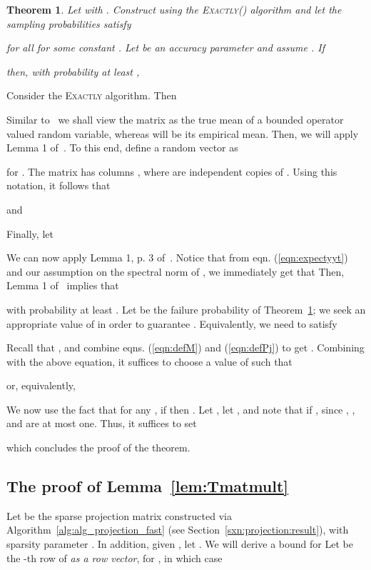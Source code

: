 \documentclass[11pt]{article}
\newtheorem{theorem}{Theorem}
\newenvironment{Proof}{\noindent {\em Proof:}}{\\\hspace*{\fill}\mbox{}}
\begin{document}
\begin{theorem}\label{thm:theorem7correct}
Let  with . Construct  using the \textsc{Exactly()} algorithm and let the sampling probabilities  satisfy

for all  for some constant . Let  be an accuracy parameter and assume . If

then, with probability at least ,

\end{theorem}

\begin{Proof}
Consider the \textsc{Exactly} algorithm. Then

Similar to~\cite{RV07} we shall view the matrix  as the true mean of a bounded operator valued random variable, whereas  will be its empirical mean. Then, we will apply Lemma 1 of~\cite{Oli10}. To this end, define a random vector  as

for . The matrix  has columns , where  are  independent copies of . Using this notation, it follows that

and

Finally, let

We can now apply Lemma 1, p. 3 of~\cite{Oli10}. Notice that from eqn. (\ref{eqn:expectyyt}) and our assumption on the spectral norm of , we immediately get that  Then, Lemma 1 of~\cite{Oli10} implies that

with probability at least . Let  be the failure probability of Theorem~\ref{thm:theorem7correct}; we seek an appropriate value of  in order to guarantee . Equivalently, we need to satisfy

Recall that , and combine eqns. (\ref{eqn:defM}) and (\ref{eqn:defPj}) to get . Combining with the above equation, it suffices to choose a value of  such that

or, equivalently,

We now use the fact that for any , if  then . Let , let , and note that  if , since , , and  are at most one. Thus, it suffices to set

which concludes the proof of the theorem.
\end{Proof}

\subsection{The proof of Lemma~\ref{lem:Tmatmult}}\label{sxn:pf_of_technical_lemma}

Let  be the sparse projection matrix constructed via Algorithm~\ref{alg:alg_projection_fast} (see Section~\ref{sxn:projection:result}), with sparsity parameter . In addition, given , let . We will derive a bound for 
Let  be the -th row of  \textit{as a row vector}, for , in which case
\end{document}
